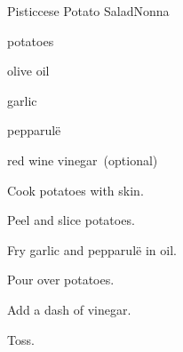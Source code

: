 \begin{recipe}{Pisticcese Potato Salad}{Nonna}{}

\begin{ingredients}
\item potatoes
\item olive oil
\item garlic
\item pepparul\"e
\item red wine vinegar~(optional)
\end{ingredients}

\begin{directions}
\item Cook potatoes with skin.
\item Peel and slice potatoes.
\item Fry garlic and pepparul\"e in oil.
\item Pour over potatoes.
\item Add a dash of vinegar.
\item Toss.
\end{directions}

\end{recipe}
